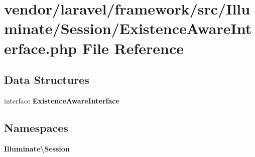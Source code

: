 \section{vendor/laravel/framework/src/\+Illuminate/\+Session/\+Existence\+Aware\+Interface.php File Reference}
\label{_existence_aware_interface_8php}
\subsection*{Data Structures}
\begin{DoxyCompactItemize}
\item 
interface {\bf Existence\+Aware\+Interface}
\end{DoxyCompactItemize}
\subsection*{Namespaces}
\begin{DoxyCompactItemize}
\item 
 {\bf Illuminate\textbackslash{}\+Session}
\end{DoxyCompactItemize}
